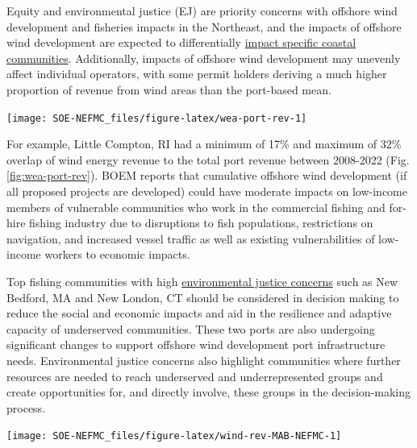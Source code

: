 \documentclass[
  10pt,
]{article}
\let\origfigure\figure
\let\endorigfigure\endfigure
\renewenvironment{figure}[1][2] {
    \expandafter\origfigure\expandafter[H]
} {
    \endorigfigure
}
\begin{document}
Equity and environmental justice (EJ) are priority concerns with offshore wind development and fisheries impacts in the Northeast, and the impacts of offshore wind development are expected to differentially \href{https://noaa-edab.github.io/catalog/wind_port.html}{impact specific coastal communities}. Additionally, impacts of offshore wind development may unevenly affect individual operators, with some permit holders deriving a much higher proportion of revenue from wind areas than the port-based mean.

\begin{figure}

\texttt{[image: SOE-NEFMC\_files/figure-latex/wea-port-rev-1]} \hfill{}

\caption{Percent of port fisheries revenue from Wind Energy Areas (WEA) in descending order from most to least port fisheries revenue from WEA. EJ = Environmental Justice.}\label{fig:wea-port-rev}
\end{figure}

For example, Little Compton, RI had a minimum of 17\% and maximum of 32\% overlap of wind energy revenue to the total port revenue between 2008-2022 (Fig. \ref{fig:wea-port-rev}). BOEM reports that cumulative offshore wind development (if all proposed projects are developed) could have moderate impacts on low-income members of vulnerable communities who work in the commercial fishing and for-hire fishing industry due to disruptions to fish populations, restrictions on navigation, and increased vessel traffic as well as existing vulnerabilities of low-income workers to economic impacts.

Top fishing communities with high \href{https://noaa-edab.github.io/catalog/engagement.html}{environmental justice concerns} such as New Bedford, MA and New London, CT should be considered in decision making to reduce the social and economic impacts and aid in the resilience and adaptive capacity of underserved communities. These two ports are also undergoing significant changes to support offshore wind development port infrastructure needs. Environmental justice concerns also highlight communities where further resources are needed to reach underserved and underrepresented groups and create opportunities for, and directly involve, these groups in the decision-making process.

\begin{figure}

\texttt{[image: SOE-NEFMC\_files/figure-latex/wind-rev-MAB-NEFMC-1]} \hfill{}

\caption{Percent of Mid-Atlantic port revenue with majority NEFMC landings from Wind Energy Areas (WEA) in descending order from most to least port fisheries revenue from WEA. EJ = Environmental Justice.}\label{fig:wind-rev-MAB-NEFMC}
\end{figure}
\end{document}

